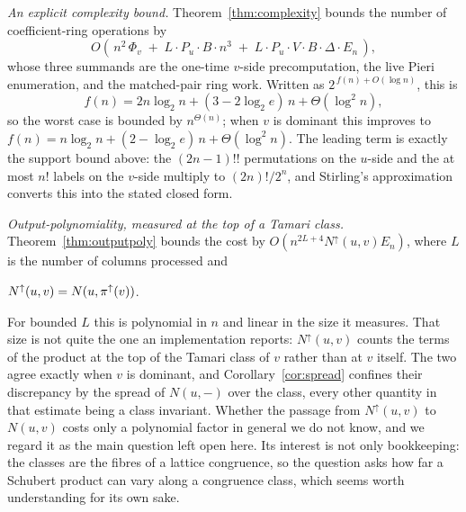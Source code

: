 \documentclass{amsart}
\theoremstyle{definition}
\theoremstyle{remark}
\numberwithin{equation}{section}
\begin{document}
\emph{An explicit complexity bound.} Theorem~\ref{thm:complexity} bounds the number of coefficient-ring operations by
$$O\!\left(\,n^2\,\Phi_v\;+\;L\cdot P_u\cdot B\cdot n^3\;+\;L\cdot P_u\cdot V\cdot B\cdot\Delta\cdot E_n\,\right),$$
whose three summands are the one-time $v$-side precomputation, the live Pieri enumeration, and the matched-pair ring work. Written as $2^{\,f(n)+O(\log n)}$, this is
$$f(n)=2n\log_2 n+(3-2\log_2 e)\,n+\Theta(\log^2 n),$$
so the worst case is bounded by $n^{\Theta(n)}$; when $v$ is dominant this improves to $f(n)=n\log_2 n+(2-\log_2 e)\,n+\Theta(\log^2 n)$. The leading term is exactly the support bound above: the $(2n-1)!!$ permutations on the $u$-side and the at most $n!$ labels on the $v$-side multiply to $(2n)!/2^n$, and Stirling's approximation converts this into the stated closed form.

\emph{Output-polynomiality, measured at the top of a Tamari class.} Theorem~\ref{thm:outputpoly} bounds the cost by $O(n^{2L+4}N^\uparrow(u,v)E_n)$, where $L$ is the number of columns processed and 

$N^\uparrow(u,v)=N(u,\pi^\uparrow(v))$.

For bounded $L$ this is polynomial in $n$ and linear in the size it measures. That size is not quite the one an implementation reports: $N^\uparrow(u,v)$ counts the terms of the product at the top of the Tamari class of $v$ rather than at $v$ itself. The two agree exactly when $v$ is dominant, and Corollary~\ref{cor:spread} confines their discrepancy by the spread of $N(u,-)$ over the class, every other quantity in that estimate being a class invariant. Whether the passage from $N^\uparrow(u,v)$ to $N(u,v)$ costs only a polynomial factor in general we do not know, and we regard it as the main question left open here. Its interest is not only bookkeeping: the classes are the fibres of a lattice congruence, so the question asks how far a Schubert product can vary along a congruence class, which seems worth understanding for its own sake.
\end{document}
